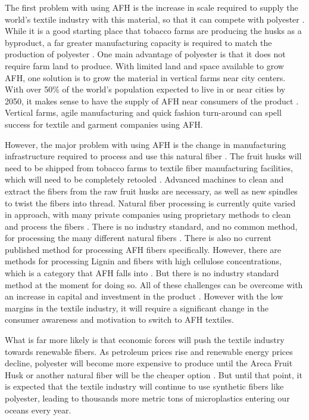 \documentclass{article}
\begin{document}
The first problem with using AFH is the increase in scale required to supply the world's textile industry with this material, so that it can compete with polyester \autocite{afhfiber}. While it is a good starting place that tobacco farms are producing the husks as a byproduct, a far greater manufacturing capacity is required to match the production of polyester \autocite{afhfiber}. One main advantage of polyester is that it does not require farm land to produce. With limited land and space available to grow AFH, one solution is to grow the material in vertical farms near city centers. With over 50\% of the world's population expected to live in or near cities by 2050, it makes sense to have the supply of AFH near consumers of the product \autocite{globaltradeanalysis}. Vertical farms, agile manufacturing and quick fashion turn-around can spell success for textile and garment companies using AFH.

However, the major problem with using AFH is the change in manufacturing infrastructure required to process and use this natural fiber \autocite{afhfiber}. The fruit husks will need to be shipped from tobacco farms to textile fiber manufacturing facilities, which will need to be completely retooled \autocite{afhfiber}. Advanced machines to clean and extract the fibers from the raw fruit husks are necessary, as well as new spindles to twist the fibers into thread. Natural fiber processing is currently quite varied in approach, with many private companies using proprietary methods to clean and process the fibers \autocite{afhfiber}. There is no industry standard, and no common method, for processing the many different natural fibers \autocite{afhfiber}. There is also no current published method for processing AFH fibers specifically. However, there are methods for processing Lignin and fibers with high cellulose concentrations, which is a category that AFH falls into \autocite{afhfiber}. But there is no industry standard method at the moment for doing so. All of these challenges can be overcome with an increase in capital and investment in the product \autocite{afhfiber}. However with the low margins in the textile industry, it will require a significant change in the consumer awareness and motivation to switch to AFH textiles.

What is far more likely is that economic forces will push the textile industry towards renewable fibers. As petroleum prices rise and renewable energy prices decline, polyester will become more expensive to produce until the Areca Fruit Husk or another natural fiber will be the cheaper option \autocite{afhfiber}. But until that point, it is expected that the textile industry will continue to use synthetic fibers like polyester, leading to thousands more metric tons of microplastics entering our oceans every year.


\printbibliography
\end{document}
